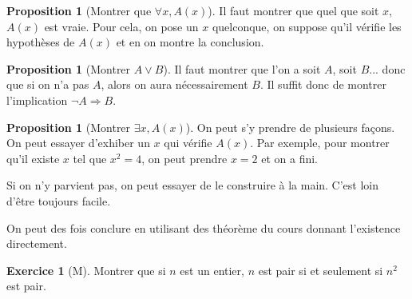 \documentclass[11pt]{article}
\theoremstyle{definition}
\newtheorem{prop}[defn]{Proposition}
\newtheorem{exo}{Exercice}
\theoremstyle{remark}
\begin{document}
\begin{prop}[Montrer que $\forall x, A(x)$]
	Il faut montrer que quel que soit $x$, $A(x)$ est vraie. Pour cela, on pose un $x$ quelconque, on suppose qu'il vérifie les hypothèses de $A(x)$ et en on montre la conclusion.
\end{prop}

\begin{prop}[Montrer $A\lor B$]
	Il faut montrer que l'on a soit $A$, soit $B$... donc que si on n'a pas $A$, alors on aura nécessairement $B$. Il suffit donc de montrer l'implication $\neg A\Rightarrow B$.
\end{prop}

\begin{prop}[Montrer $\exists x,A(x)$]
	On peut s'y prendre de plusieurs façons. On peut essayer d'exhiber un $x$ qui vérifie $A(x)$. Par exemple, pour montrer qu'il existe $x$ tel que $x^2=4$, on peut prendre $x=2$ et on a fini. 
	
	Si on n'y parvient pas, on peut essayer de le construire à la main. C'est loin d'être toujours facile.
	
	On peut des fois conclure en utilisant des théorème du cours donnant l'existence directement.
\end{prop}

\begin{exo}[M]
	Montrer que si $n$ est un entier, $n$ est pair si et seulement si $n^2$ est pair.
\end{exo}
\end{document}
